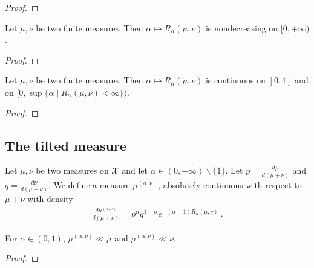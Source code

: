 \begin{proof}
\end{proof}

\begin{lemma}
  \label{lem:renyi_monotone}
  Let $\mu, \nu$ be two finite measures. Then $\alpha \mapsto R_\alpha(\mu, \nu)$ is nondecreasing on $[0, + \infty)$.
\end{lemma}

\begin{proof}
\end{proof}

\begin{lemma}
  \label{lem:renyi_continuous}
  Let $\mu, \nu$ be two finite measures. Then $\alpha \mapsto R_\alpha(\mu, \nu)$ is continuous on $[0, 1]$ and on $[0, \sup \{\alpha \mid R_\alpha(\mu, \nu) < \infty\})$.
\end{lemma}

\begin{proof}
\end{proof}




\subsection{The tilted measure}

\begin{definition}
  \label{def:renyiMeasure}
  Let $\mu, \nu$ be two measures on $\mathcal X$ and let $\alpha \in (0, +\infty) \backslash \{1\}$. Let $p = \frac{d \mu}{d (\mu + \nu)}$ and $q = \frac{d \nu}{d (\mu + \nu)}$. We define a measure $\mu^{(\alpha, \nu)}$, absolutely continuous with respect to $\mu + \nu$ with density
  \begin{align*}
  \frac{d \mu^{(\alpha, \nu)}}{d (\mu + \nu)} = p^\alpha q^{1 - \alpha} e^{-(\alpha - 1)R_\alpha(\mu, \nu)} \: .
  \end{align*}
\end{definition}


\begin{lemma}
  \label{lem:renyiMeasure_ac}
  For $\alpha \in (0,1)$, $\mu^{(\alpha, \nu)} \ll \mu$ and $\mu^{(\alpha, \nu)} \ll \nu$.
\end{lemma}

\begin{proof}%
\uses{}

\end{proof}


